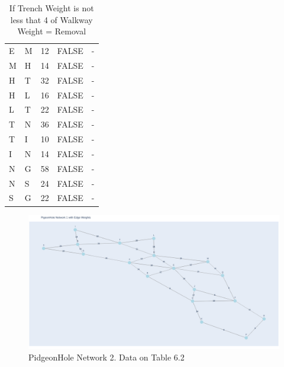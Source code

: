 \documentclass[11pt]{book}
\renewcommand{\=}[1]{\stackrel{#1}{=}} %
\theoremstyle{definition}
\theoremstyle{remark}
\begin{document}
\begin{table}[]
\begin{tabular}{lllll}
E & M & 12 & FALSE & - \\
\rowcolor[HTML]{9AFF99} 
M & H & 14 & FALSE & - \\
H & T & 32 & FALSE & - \\
\rowcolor[HTML]{9AFF99} 
H & L & 16 & FALSE & - \\
\rowcolor[HTML]{FFCCC9} 
L & T & 22 & FALSE & - \\
T & N & 36 & FALSE & - \\
\rowcolor[HTML]{9AFF99} 
T & I & 10 & FALSE & - \\
I & N & 14 & FALSE & - \\
N & G & 58 & FALSE & - \\
\rowcolor[HTML]{9AFF99} 
N & S & 24 & FALSE & - \\
\rowcolor[HTML]{9AFF99} 
S & G & 22 & FALSE & -
\end{tabular}
\caption{If Trench Weight is not less that 4 of Walkway Weight = Removal}
\label{tab:my-table}
\end{table}

\begin{figure}
    \centering
    \includegraphics[width=1\linewidth]{img/PigeonHole NW2.png}
    \caption{PidgeonHole Network 2. Data on Table 6.2}
    \label{fig:enter-label}
\end{figure}
\end{document}
